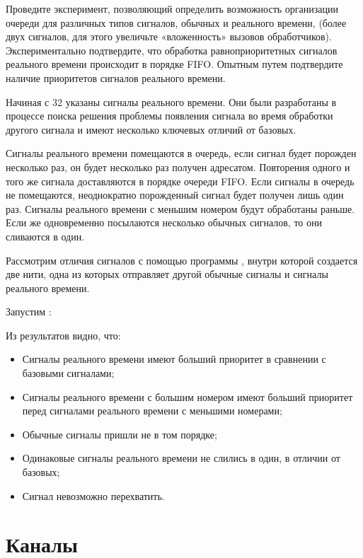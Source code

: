 Проведите эксперимент, позволяющий определить возможность организации очереди для различных типов сигналов, обычных и реального времени, (более двух сигналов, для этого увеличьте «вложенность» вызовов обработчиков). Экспериментально подтвердите, что обработка равноприоритетных сигналов реального времени происходит в порядке FIFO. Опытным путем подтвердите наличие приоритетов сигналов реального времени.

Начиная с 32 указаны сигналы реального времени. Они были разработаны в процессе поиска решения проблемы появления сигнала во время обработки другого сигнала и имеют несколько ключевых отличий от базовых.

Сигналы реального времени помещаются в очередь, если сигнал будет порожден несколько раз, он будет несколько раз получен адресатом. Повторения одного и того же сигнала доставляются в порядке очереди FIFO. Если сигналы в очередь не помещаются, неоднократно порожденный сигнал будет получен лишь один раз. Сигналы реального времени с меньшим номером будут обработаны раньше. Если же одновременно посылаются несколько обычных сигналов, то они сливаются в один.

Рассмотрим отличия сигналов с помощью программы , внутри которой создается две нити, одна из которых отправляет другой обычные сигналы и сигналы реального времени.


Запустим :


Из результатов видно, что:

\begin{itemize}
	\item Сигналы реального времени имеют больший приоритет в сравнении с базовыми сигналами;
	\item Сигналы реального времени с большим номером имеют больший приоритет перед сигналами реального времени с меньшими номерами;
	\item Обычные сигналы пришли не в том порядке;
	\item Одинаковые сигналы реального времени не слились в один, в отличии от базовых;
	\item Сигнал  невозможно перехватить.
\end{itemize}

\section{Каналы}

